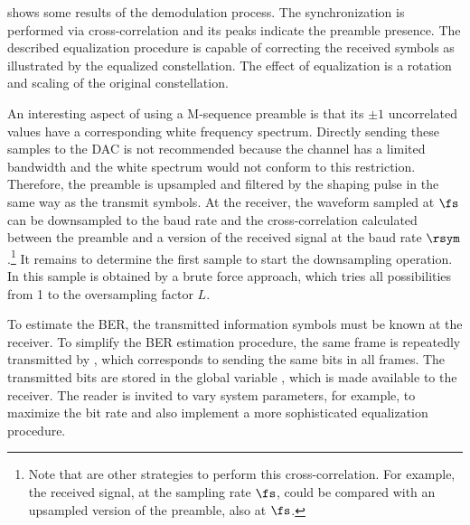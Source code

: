  shows some results of the demodulation process. The  synchronization is performed via cross-correlation and its peaks indicate the preamble presence. The described equalization procedure is capable of correcting the received symbols as illustrated by the equalized constellation. The effect of equalization is a rotation and scaling of the original constellation.

An interesting aspect of using a M-sequence preamble is that its $\pm 1$ uncorrelated values have a corresponding white frequency spectrum. Directly sending these samples to the DAC is not recommended because the channel has a limited bandwidth and the white spectrum would not conform to this restriction. Therefore, the preamble is upsampled and filtered by the shaping pulse in the same way as the transmit symbols. At the receiver, the waveform sampled at $\fs$ can be downsampled to the baud rate and the cross-correlation calculated between the preamble and a version of the received signal at the baud rate $\rsym$.\footnote{Note that are other strategies to perform this cross-correlation. For example, the received signal, at the sampling rate $\fs$, could be compared with an upsampled version of the preamble, also at $\fs$.} It remains to determine the first sample to start the downsampling operation. In  this sample is obtained by a brute force approach, which tries all possibilities from 1 to the oversampling factor $L$.

To estimate the BER, the transmitted information symbols must be known at the receiver. To simplify the BER estimation procedure, the same frame is repeatedly transmitted by , which corresponds to sending the same bits in all frames. The transmitted bits are stored in the global variable , which is made available to the receiver. 
The reader is invited to vary system parameters, for example, to maximize the bit rate and also implement a more sophisticated equalization procedure.
\eApplication

